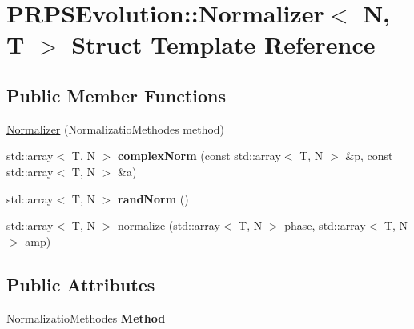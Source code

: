\hypertarget{struct_p_r_p_s_evolution_1_1_normalizer}{\section{P\-R\-P\-S\-Evolution\-:\-:Normalizer$<$ N, T $>$ Struct Template Reference}
\label{struct_p_r_p_s_evolution_1_1_normalizer}
}
\subsection*{Public Member Functions}
\begin{DoxyCompactItemize}
\item 
\hyperlink{struct_p_r_p_s_evolution_1_1_normalizer_af8c736f39d1d48d095701c7b506afaef}{Normalizer} (Normalizatio\-Methodes method)
\item 
\hypertarget{struct_p_r_p_s_evolution_1_1_normalizer_a89cc950cde6bbf41b71a0486c5b369a9}{std\-::array$<$ T, N $>$ {\bfseries complex\-Norm} (const std\-::array$<$ T, N $>$ \&p, const std\-::array$<$ T, N $>$ \&a)}\label{struct_p_r_p_s_evolution_1_1_normalizer_a89cc950cde6bbf41b71a0486c5b369a9}

\item 
\hypertarget{struct_p_r_p_s_evolution_1_1_normalizer_afdbc126fac8aaa9dc09515c57cda3e47}{std\-::array$<$ T, N $>$ {\bfseries rand\-Norm} ()}\label{struct_p_r_p_s_evolution_1_1_normalizer_afdbc126fac8aaa9dc09515c57cda3e47}

\item 
std\-::array$<$ T, N $>$ \hyperlink{struct_p_r_p_s_evolution_1_1_normalizer_a94f3435171f94f8969eeebcf8e80037d}{normalize} (std\-::array$<$ T, N $>$ phase, std\-::array$<$ T, N $>$ amp)
\end{DoxyCompactItemize}
\subsection*{Public Attributes}
\begin{DoxyCompactItemize}
\item 
\hypertarget{struct_p_r_p_s_evolution_1_1_normalizer_a0319d39d11a258e51c5846a85e50097b}{Normalizatio\-Methodes {\bfseries Method}}\label{struct_p_r_p_s_evolution_1_1_normalizer_a0319d39d11a258e51c5846a85e50097b}

\end{DoxyCompactItemize}


